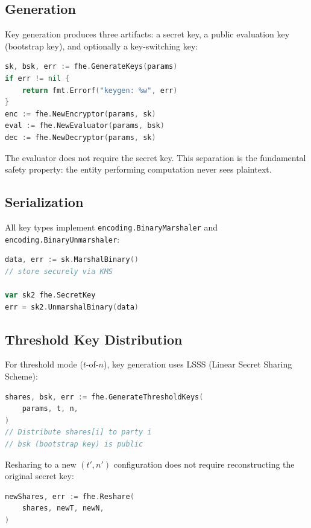 \documentclass[11pt]{article}
\begin{document}
\subsection{Generation}

Key generation produces three artifacts: a secret key, a public evaluation key (bootstrap key), and optionally a key-switching key:

\begin{lstlisting}[language=Go]
sk, bsk, err := fhe.GenerateKeys(params)
if err != nil {
    return fmt.Errorf("keygen: %w", err)
}
enc := fhe.NewEncryptor(params, sk)
eval := fhe.NewEvaluator(params, bsk)
dec := fhe.NewDecryptor(params, sk)
\end{lstlisting}

The evaluator does not require the secret key. This separation is the fundamental safety property: the entity performing computation never sees plaintext.

\subsection{Serialization}

All key types implement \texttt{encoding.BinaryMarshaler} and \texttt{encoding.BinaryUnmarshaler}:

\begin{lstlisting}[language=Go]
data, err := sk.MarshalBinary()
// store securely via KMS

var sk2 fhe.SecretKey
err = sk2.UnmarshalBinary(data)
\end{lstlisting}

\subsection{Threshold Key Distribution}

For threshold mode ($t$-of-$n$), key generation uses LSSS (Linear Secret Sharing Scheme):

\begin{lstlisting}[language=Go]
shares, bsk, err := fhe.GenerateThresholdKeys(
    params, t, n,
)
// Distribute shares[i] to party i
// bsk (bootstrap key) is public
\end{lstlisting}

Resharing to a new $(t', n')$ configuration does not require reconstructing the original secret key:

\begin{lstlisting}[language=Go]
newShares, err := fhe.Reshare(
    shares, newT, newN,
)
\end{lstlisting}
\end{document}
